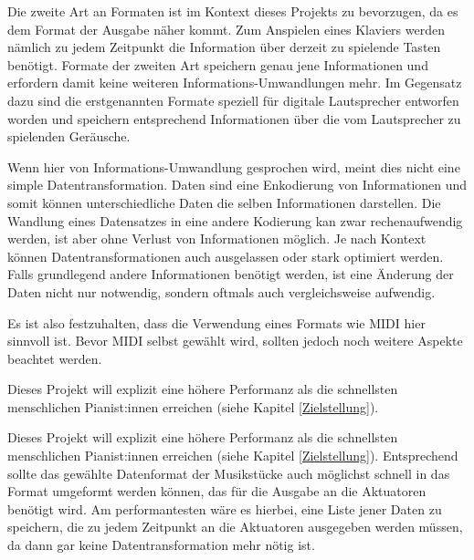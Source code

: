 Die zweite Art an Formaten ist im Kontext dieses Projekts zu bevorzugen, da es dem Format der Ausgabe näher kommt.
Zum Anspielen eines Klaviers werden nämlich zu jedem Zeitpunkt die Information über derzeit zu spielende Tasten benötigt.
Formate der zweiten Art speichern genau jene Informationen und erfordern damit keine weiteren Informations-Umwandlungen mehr. \newline
Im Gegensatz dazu sind die erstgenannten Formate speziell für digitale Lautsprecher entworfen worden und speichern entsprechend Informationen über die vom Lautsprecher zu spielenden Geräusche.

Wenn hier von Informations-Umwandlung gesprochen wird, meint dies nicht eine simple Datentransformation.
Daten sind eine Enkodierung von Informationen und somit können unterschiedliche Daten die selben Informationen darstellen.
Die Wandlung eines Datensatzes in eine andere Kodierung kan zwar rechenaufwendig werden, ist aber ohne Verlust von Informationen möglich.
Je nach Kontext können Datentransformationen auch ausgelassen oder stark optimiert werden.
Falls grundlegend andere Informationen benötigt werden, ist eine Änderung der Daten nicht nur notwendig, sondern oftmals auch vergleichsweise aufwendig.

Es ist also festzuhalten, dass die Verwendung eines Formats wie \ac{MIDI} hier sinnvoll ist.
Bevor \ac{MIDI} selbst gewählt wird, sollten jedoch noch weitere Aspekte beachtet werden.

Dieses Projekt will explizit eine höhere Performanz als die schnellsten menschlichen Pianist:innen erreichen (siehe Kapitel \ref*{Zielstellung}). %

Dieses Projekt will explizit eine höhere Performanz als die schnellsten menschlichen Pianist:innen erreichen (siehe Kapitel \ref*{Zielstellung}).
Entsprechend sollte das gewählte Datenformat der Musikstücke auch möglichst schnell in das Format umgeformt werden können, das für die Ausgabe an die Aktuatoren benötigt wird.
Am performantesten wäre es hierbei, eine Liste jener Daten zu speichern, die zu jedem Zeitpunkt an die Aktuatoren ausgegeben werden müssen, da dann gar keine Datentransformation mehr nötig ist.

